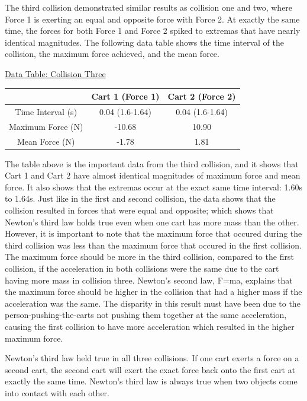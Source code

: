 \documentclass[aps,letterpaper,11pt]{revtex4}
\begin{document}
The third collision demonstrated similar results as collision one and two, where Force 1 is exerting an equal and opposite force with Force 2. At exactly the same time, the forces for both Force 1 and Force 2 spiked to extremas that have nearly identical magnitudes. The following data table shows the time interval of the collision, the maximum force achieved, and the mean force. 

\begin{center}
\underline{Data Table: Collision Three}\\
\begin{tabular}{|c|c|c|}
\hline
 & Cart 1 (Force 1) & Cart 2 (Force 2)\\
 \hline
 Time Interval (s) & 0.04 (1.6-1.64) & 0.04 (1.6-1.64)\\
 \hline
 Maximum Force (N) & -10.68 & 10.90\\
 \hline
 Mean Force (N) & -1.78 & 1.81\\
 \hline
\end{tabular}
\end{center}

The table above is the important data from the third collision, and it shows that Cart 1 and Cart 2 have almost identical magnitudes of maximum force and mean force. It also shows that the extremas occur at the exact same time interval: 1.60s to 1.64s. Just like in the first and second collision, the data shows that the collision resulted in forces that were equal and opposite; which shows that Newton's third law holds true even when one cart has more mass than the other. However, it is important to note that the maximum force that occured during the third collision was less than the maximum force that occured in the first collision. The maximum force should be more in the third collision, compared to the first collision, if the acceleration in both collisions were the same due to the cart having more mass in collision three. Newton's second law, F=ma, explains that the maximum force should be higher in the collision that had a higher mass if the acceleration was the same. The disparity in this result must have been due to the person-pushing-the-carts not pushing them together at the same acceleration, causing the first collision to have more acceleration which resulted in the higher maximum force. 

Newton's third law held true in all three collisions. If one cart exerts a force on a second cart, the second cart will exert the exact force back onto the first cart at exactly the same time. Newton's third law is always true when two objects come into contact with each other.
\end{document}
